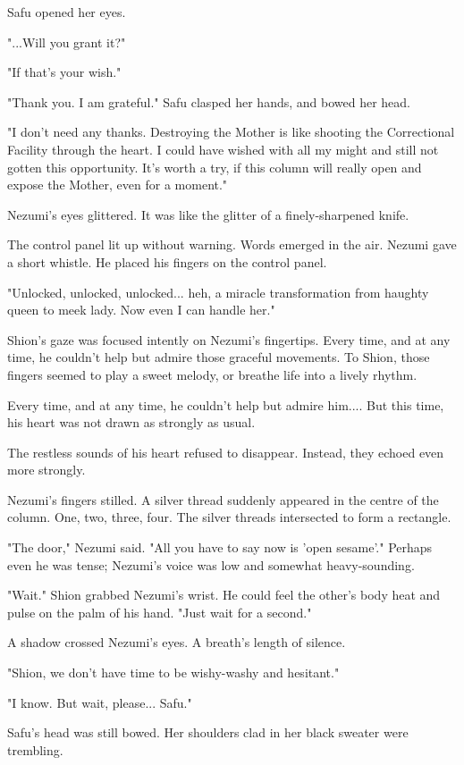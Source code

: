 Safu opened her eyes.

"...Will you grant it?"

"If that's your wish."

\mybreak

"Thank you. I am grateful." Safu clasped her hands, and bowed her head.

"I don't need any thanks. Destroying the Mother is like shooting the
Correctional Facility through the heart. I could have wished with all my
might and still not gotten this opportunity. It's worth a try, if this
column will really open and expose the Mother, even for a moment."

Nezumi's eyes glittered. It was like the glitter of a finely-sharpened
knife.

The control panel lit up without warning. Words emerged in the air.
Nezumi gave a short whistle. He placed his fingers on the control panel.

"Unlocked, unlocked, unlocked... heh, a miracle transformation from
haughty queen to meek lady. Now even I can handle her."

Shion's gaze was focused intently on Nezumi's fingertips. Every time,
and at any time, he couldn't help but admire those graceful movements.
To Shion, those fingers seemed to play a sweet melody, or breathe life
into a lively rhythm.

Every time, and at any time, he couldn't help but admire him.... But
this time, his heart was not drawn as strongly as usual.

The restless sounds of his heart refused to disappear. Instead, they
echoed even more strongly.

Nezumi's fingers stilled. A silver thread suddenly appeared in the
centre of the column. One, two, three, four. The silver threads
intersected to form a rectangle.

"The door," Nezumi said. "All you have to say now is 'open sesame'."
Perhaps even he was tense; Nezumi's voice was low and somewhat
heavy-sounding.

"Wait." Shion grabbed Nezumi's wrist. He could feel the other's body
heat and pulse on the palm of his hand. "Just wait for a second."

A shadow crossed Nezumi's eyes. A breath's length of silence.

"Shion, we don't have time to be wishy-washy and hesitant."

"I know. But wait, please... Safu."

Safu's head was still bowed. Her shoulders clad in her black sweater
were trembling.

